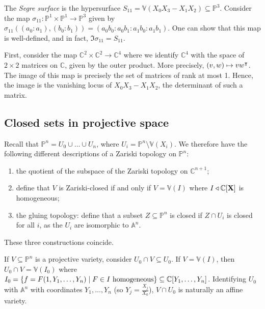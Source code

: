 \begin{example}
    The \emph{Segre surface} is the hypersurface \( S_{11} = \mathbb V(X_0X_3 - X_1X_2) \subseteq \mathbb P^3 \).
    Consider the map \( \sigma_{11} \colon \mathbb P^1 \times \mathbb P^1 \to \mathbb P^3 \) given by \( \sigma_{11}((a_0 : a_1), (b_0 : b_1)) = (a_0 b_0 : a_0 b_1 : a_1 b_0 : a_1 b_1) \).
    One can show that this map is well-defined, and in fact, \( \Im \sigma_{11} = S_{11} \).

    First, consider the map \( \mathbb C^2 \times \mathbb C^2 \to \mathbb C^4 \) where we identify \( \mathbb C^4 \) with the space of \( 2 \times 2 \) matrices on \( \mathbb C \), given by the outer product.
    More precisely, \( (v,w) \mapsto vw^\intercal \).
    The image of this map is precisely the set of matrices of rank at most 1.
    Hence, the image is the vanishing locus of \( X_0 X_3 - X_1 X_2 \), the determinant of such a matrix.
\end{example}

\subsection{Closed sets in projective space}
Recall that \( \mathbb P^n = U_0 \cup \dots \cup U_n \), where \( U_i = \mathbb P^n \setminus \mathbb V(X_i) \).
We therefore have the following different descriptions of a Zariski topology on \( \mathbb P^n \):
\begin{enumerate}
    \item the quotient of the subspace of the Zariski topology on \( \mathbb C^{n+1} \);
    \item define that \( V \) is Zariski-closed if and only if \( V = \mathbb V(I) \) where \( I \triangleleft \mathbb C[\vb X] \) is homogeneous;
    \item the gluing topology: define that a subset \( Z \subseteq \mathbb P^n \) is closed if \( Z \cap U_i \) is closed for all \( i \), as the \( U_i \) are isomorphic to \( \mathbb A^n \).
\end{enumerate}
These three constructions coincide.

If \( V \subseteq \mathbb P^n \) is a projective variety, consider \( U_0 \cap V \subseteq U_0 \).
If \( V = \mathbb V(I) \), then \( U_0 \cap V = \mathbb V(I_0) \) where \( I_0 = \qty{f = F(1, Y_1, \dots, Y_n) \mid F \in I \text{ homogeneous}} \subseteq \mathbb C[Y_1, \dots, Y_n] \).
Identifying \( U_0 \) with \( \mathbb A^n \) with coordinates \( Y_1, \dots, Y_n \) (so \( Y_j = \frac{X_j}{X_0} \)), \( V \cap U_0 \) is naturally an affine variety.

